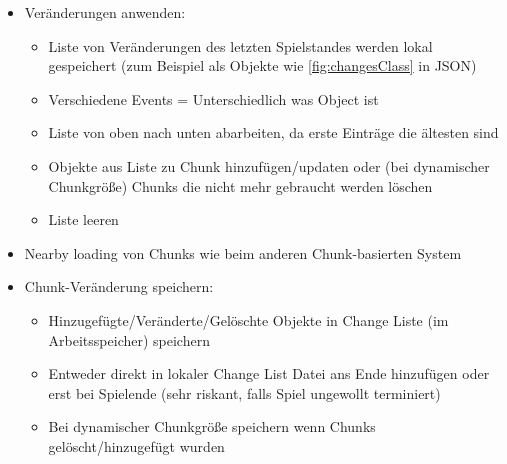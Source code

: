 \begin{itemize}
    \item Veränderungen anwenden:
    \begin{itemize}
        \item Liste von Veränderungen des letzten Spielstandes werden lokal gespeichert (zum Beispiel als Objekte wie \ref{fig:changesClass} in JSON)
        \item Verschiedene Events = Unterschiedlich was Object ist
        \item Liste von oben nach unten abarbeiten, da erste Einträge die ältesten sind 
        \item Objekte aus Liste zu Chunk hinzufügen/updaten oder (bei dynamischer Chunkgröße) Chunks die nicht mehr gebraucht werden löschen
        \item Liste leeren
    \end{itemize}
    \item Nearby loading von Chunks wie beim anderen Chunk-basierten System
    \item Chunk-Veränderung speichern:
    \begin{itemize}
        \item Hinzugefügte/Veränderte/Gelöschte Objekte in Change Liste (im Arbeitsspeicher) speichern
        \item Entweder direkt in lokaler Change List Datei ans Ende hinzufügen oder erst bei Spielende (sehr riskant, falls Spiel ungewollt terminiert)
        \item Bei dynamischer Chunkgröße speichern wenn Chunks gelöscht/hinzugefügt wurden
    \end{itemize}
\end{itemize}